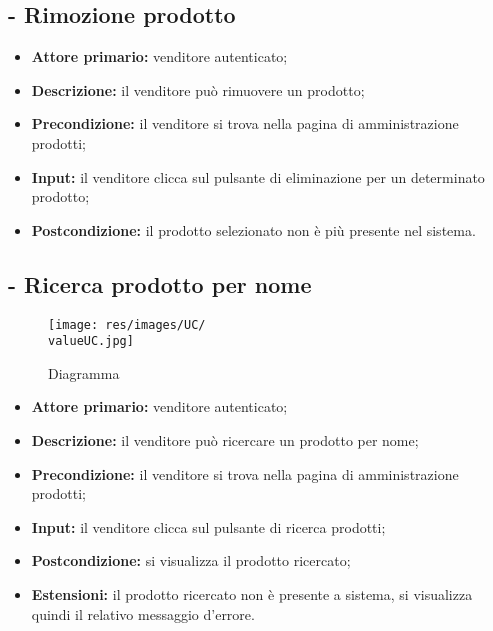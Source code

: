 \stepUserCase
\subsection{- Rimozione prodotto}
\begin{itemize}
    \item \textbf{Attore primario:} venditore autenticato;
    \item \textbf{Descrizione:} il venditore può rimuovere un prodotto;
    \item \textbf{Precondizione:} il venditore si trova nella pagina di amministrazione prodotti;
    \item \textbf{Input:} il venditore clicca sul pulsante di eliminazione per un determinato prodotto;
    \item \textbf{Postcondizione:} il prodotto selezionato non è più presente nel sistema.
\end{itemize}

\stepUserCase
\subsection{- Ricerca prodotto per nome}
\begin{figure}[H]
    \centering
    \texttt{[image: res/images/UC/\\valueUC.jpg]}
    \caption{Diagramma }
\end{figure}
\begin{itemize}
    \item \textbf{Attore primario:} venditore autenticato;
    \item \textbf{Descrizione:} il venditore può ricercare un prodotto per nome;
    \item \textbf{Precondizione:} il venditore si trova nella pagina di amministrazione prodotti;
    \item \textbf{Input:} il venditore clicca sul pulsante di ricerca prodotti;
    \item \textbf{Postcondizione:} si visualizza il prodotto ricercato;
    \item \textbf{Estensioni:} il prodotto ricercato non è presente a sistema, si visualizza quindi il relativo messaggio d'errore.
\end{itemize}

\stepUserCase
